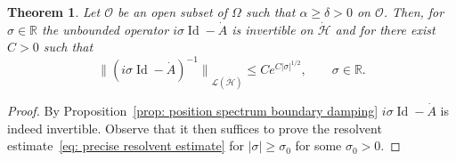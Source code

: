 \documentclass[JEP,XML,SOM,Unicode,published]{cedram}
\theoremstyle{plain}
\newtheorem{theorem}{Theorem}[section]
\theoremstyle{definition}
\def\R{\mathbb{R}}
\renewcommand{\H}{{\mathcal H}}
\newcommand{\scrO}{\mathscr O}
\newcommand{\Norm}[2]{{\| #1 \|}_{#2}}
\DeclareMathOperator{\id}{Id}
\begin{document}
\begin{theorem}\label{res}
Let $\scrO$ be an open subset of $\Omega$ such that $\alpha\geq
\delta>0$ on $\scrO$. Then, for $\sigma \in \R$ the unbounded
operator $i\sigma\id -\dot {A}$ is invertible on $\dot \H$ and
for there exist $C>0$ such that
\begin{equation}
\label{eq: precise resolvent estimate}
\Norm{ (i\sigma\id-\dot{A})^{-1}}{\mathcal{L}(\dot{\H})}
\leq C e^{C |\sigma|^{1/2}}, \qquad \sigma \in \R.
\end{equation}
\end{theorem}
\begin{proof}
By Proposition~\ref{prop: position spectrum boundary damping}
$i\sigma\id -\dot {A}$ is indeed invertible. Observe that it then
suffices to prove the resolvent estimate~\eqref{eq: precise resolvent
estimate} for $|\sigma| \geq \sigma_0$ for some $\sigma_0>0$.


\end{proof}
\end{document}

